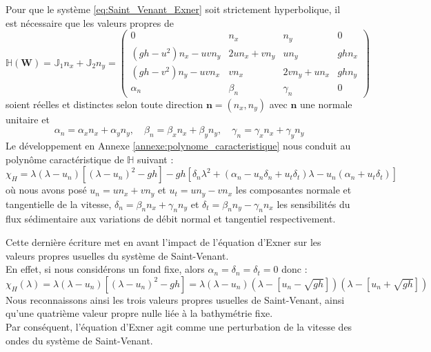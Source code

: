 \documentclass[11pt, a4paper, oneside]{report}
\begin{document}
Pour que le système \eqref{eq:Saint_Venant_Exner} soit strictement hyperbolique, il est nécessaire que les valeurs propres de
\begin{equation}
    \mathbb{H}(\bm{W}) = \mathbb{J}_1 n_x + \mathbb{J}_2 n_y = \begin{pmatrix}
        0 & n_x & n_y & 0 \\
        (gh - u^2) n_x - uv n_y & 2u n_x + v n_y & u n_y & gh n_x \\
        (gh - v^2) n_y - uv n_x & v n_x & 2v n_y + u n_x & gh n_y \\
        \alpha_n & \beta_n & \gamma_n & 0
    \end{pmatrix}
\end{equation}
soient réelles et distinctes selon toute direction $\bm{n} = (n_x, n_y)$ avec $\bm{n}$ une normale unitaire et
\begin{equation}
    \alpha_n = \alpha_x n_x + \alpha_y n_y, \quad \beta_n = \beta_x n_x + \beta_y n_y, \quad \gamma_n = \gamma_x n_x + \gamma_y n_y
\end{equation}
Le développement en Annexe \ref{annexe:polynome_caracteristique} nous conduit au polynôme caractéristique de $\mathbb{H}$ suivant :
\begin{equation} \label{eq:Polynome_caracteristique}
    \chi_H = \lambda(\lambda - u_n) \left[ (\lambda - u_n)^2 - gh \right] - gh \left[ \delta_n \lambda^2 + \left( \alpha_n - u_n \delta_n + u_t \delta_t \right) \lambda - u_n \left( \alpha_n + u_t \delta_t \right) \right]
\end{equation}
où nous avons posé $u_n = u n_x + v n_y$ et $u_t = u n_y - v n_x$ les composantes normale et tangentielle de la vitesse, $\delta_n = \beta_n n_x + \gamma_n n_y$ et $\delta_t = \beta_n n_y - \gamma_n n_x$ les sensibilités du flux sédimentaire aux variations de débit normal et tangentiel respectivement.

Cette dernière écriture met en avant l'impact de l'équation d'Exner sur les valeurs propres usuelles du système de Saint-Venant. \\
En effet, si nous considérons un fond fixe, alors $\alpha_n = \delta_n = \delta_t = 0$ donc :
\begin{equation}
    \chi_H(\lambda) = \lambda(\lambda - u_n) \left[ (\lambda - u_n)^2 - gh \right] = \lambda (\lambda - u_n) \left( \lambda - \left[u_n - \sqrt{gh}\right] \right) \left( \lambda - \left[ u_n + \sqrt{gh} \right] \right)
\end{equation}
Nous reconnaissons ainsi les trois valeurs propres usuelles de Saint-Venant, ainsi qu'une quatrième valeur propre nulle liée à la bathymétrie fixe. \\
Par conséquent, l'équation d'Exner agit comme une perturbation de la vitesse des ondes du système de Saint-Venant.
\end{document}

